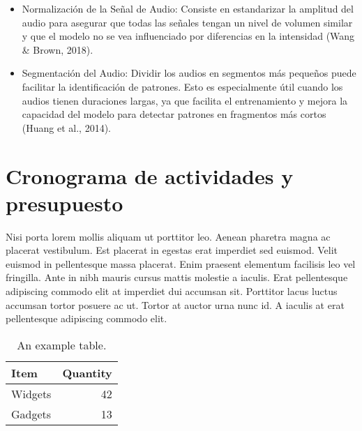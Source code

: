 \begin{itemize}
	\item Normalización de la Señal de Audio: Consiste en estandarizar la amplitud del audio para asegurar que todas las señales tengan un nivel de volumen similar y que el modelo no se vea influenciado por diferencias en la intensidad (Wang \& Brown, 2018).
	\item Segmentación del Audio: Dividir los audios en segmentos más pequeños puede facilitar la identificación de patrones. Esto es especialmente útil cuando los audios tienen duraciones largas, ya que facilita el entrenamiento y mejora la capacidad del modelo para detectar patrones en fragmentos más cortos (Huang et al., 2014).
\end{itemize}


\section{Cronograma de actividades y presupuesto}
Nisi porta lorem mollis aliquam ut porttitor leo. Aenean pharetra magna ac placerat vestibulum. Est placerat in egestas erat imperdiet sed euismod. Velit euismod in pellentesque massa placerat. Enim praesent elementum facilisis leo vel fringilla. Ante in nibh mauris cursus mattis molestie a iaculis. Erat pellentesque adipiscing commodo elit at imperdiet dui accumsan sit. Porttitor lacus luctus accumsan tortor posuere ac ut. Tortor at auctor urna nunc id. A iaculis at erat pellentesque adipiscing commodo elit.

\begin{table}[h]
	\centering
	\begin{tabular}{l|r}
		Item & Quantity \\\hline
		Widgets & 42 \\
		Gadgets & 13
	\end{tabular}
	\caption{\label{tab:widgets}An example table.}
\end{table}